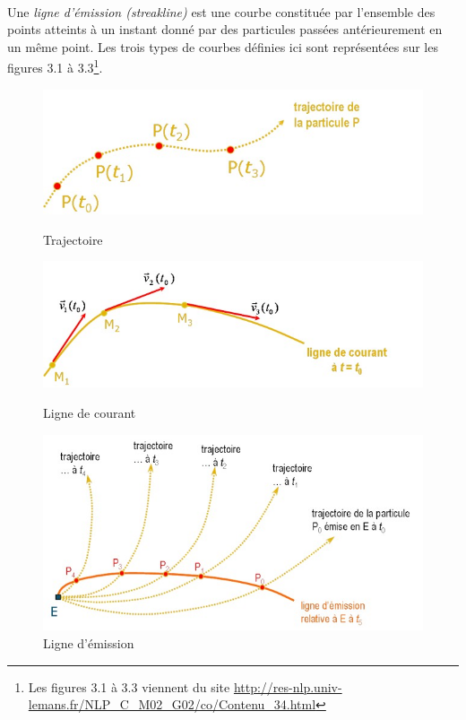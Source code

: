 \paragraph{}
Une \emph{ligne d'émission (streakline)} est une courbe constituée par l'ensemble des points atteints à un instant donné par des particules passées antérieurement en un même point. Les trois types de courbes définies ici sont représentées sur les figures 3.1 à 3.3\footnote{Les figures 3.1 à 3.3 viennent du site \url{http://res-nlp.univ-lemans.fr/NLP_C_M02_G02/co/Contenu_34.html}}.
\begin{figure}
    \begin{minipage}[b]{0.4\linewidth}
        \includegraphics[scale=0.75]{trajectoire.jpg}
        \caption{Trajectoire}
    \end{minipage}\hfill
    \begin{minipage}[b]{0.4\linewidth}
         \includegraphics[scale=0.75]{courant.jpg}
        \caption{Ligne de courant}
    \end{minipage}
    \begin{minipage}[c]{0.4\linewidth}
       \begin{center}
 \includegraphics[scale=0.75]{emission.jpg}
\end{center}
        \caption{Ligne d'émission}
    \end{minipage}
\end{figure}
